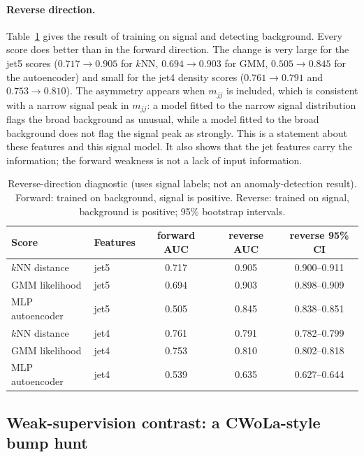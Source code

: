 \documentclass[11pt,a4paper]{article}
\newcommand{\mjj}{\ensuremath{m_{jj}}\xspace}
\begin{document}
\paragraph{Reverse direction.}
Table~\ref{tab:reverse} gives the result of training on signal and detecting background. Every score
does better than in the forward direction. The change is very large for the jet5 scores
($0.717\to0.905$ for $k$NN, $0.694\to0.903$ for GMM, $0.505\to0.845$ for the autoencoder) and small
for the jet4 density scores ($0.761\to0.791$ and $0.753\to0.810$). The asymmetry appears when \mjj is
included, which is consistent with a narrow signal peak in \mjj: a model fitted to the narrow signal
distribution flags the broad background as unusual, while a model fitted to the broad background
does not flag the signal peak as strongly. This is a statement about these features and this signal
model. It also shows that the jet features carry the information; the forward weakness is not a
lack of input information.

\begin{table}[t]
\centering
\caption{Reverse-direction diagnostic (uses signal labels; not an anomaly-detection result). Forward:
trained on background, signal is positive. Reverse: trained on signal, background is positive;
95\% bootstrap intervals.}
\label{tab:reverse}
\begin{tabular}{llccc}
\toprule
Score & Features & forward AUC & reverse AUC & reverse 95\% CI \\
\midrule
$k$NN distance  & jet5 & 0.717 & 0.905 & 0.900--0.911 \\
GMM likelihood  & jet5 & 0.694 & 0.903 & 0.898--0.909 \\
MLP autoencoder & jet5 & 0.505 & 0.845 & 0.838--0.851 \\
$k$NN distance  & jet4 & 0.761 & 0.791 & 0.782--0.799 \\
GMM likelihood  & jet4 & 0.753 & 0.810 & 0.802--0.818 \\
MLP autoencoder & jet4 & 0.539 & 0.635 & 0.627--0.644 \\
\bottomrule
\end{tabular}
\end{table}

\subsection{Weak-supervision contrast: a CWoLa-style bump hunt}
\label{sec:cwola}
\end{document}
